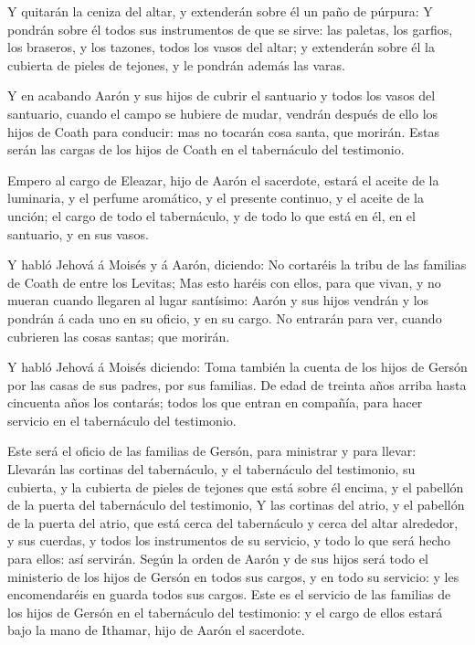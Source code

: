  Y quitarán la ceniza del altar, y extenderán sobre él un
paño de púrpura:  Y pondrán sobre él todos sus instrumentos
de que se sirve: las paletas, los garfios, los braseros, y los tazones,
todos los vasos del altar; y extenderán sobre él la cubierta de pieles
de tejones, y le pondrán además las varas.

 Y en acabando Aarón y sus hijos de cubrir el santuario y
todos los vasos del santuario, cuando el campo se hubiere de mudar,
vendrán después de ello los hijos de Coath para conducir: mas no tocarán
cosa santa, que morirán. Estas serán las cargas de los hijos de Coath en
el tabernáculo del testimonio.

 Empero al cargo de Eleazar, hijo de Aarón el sacerdote,
estará el aceite de la luminaria, y el perfume aromático, y el presente
continuo, y el aceite de la unción; el cargo de todo el tabernáculo, y
de todo lo que está en él, en el santuario, y en sus vasos.

 Y habló Jehová á Moisés y á Aarón, diciendo: 
No cortaréis la tribu de las familias de Coath de entre los Levitas;
 Mas esto haréis con ellos, para que vivan, y no mueran
cuando llegaren al lugar santísimo: Aarón y sus hijos vendrán y los
pondrán á cada uno en su oficio, y en su cargo.  No
entrarán para ver, cuando cubrieren las cosas santas; que morirán.

 Y habló Jehová á Moisés diciendo:  Toma
también la cuenta de los hijos de Gersón por las casas de sus padres,
por sus familias.  De edad de treinta años arriba hasta
cincuenta años los contarás; todos los que entran en compañía, para
hacer servicio en el tabernáculo del testimonio.

 Este será el oficio de las familias de Gersón, para
ministrar y para llevar:  Llevarán las cortinas del
tabernáculo, y el tabernáculo del testimonio, su cubierta, y la cubierta
de pieles de tejones que está sobre él encima, y el pabellón de la
puerta del tabernáculo del testimonio,  Y las cortinas del
atrio, y el pabellón de la puerta del atrio, que está cerca del
tabernáculo y cerca del altar alrededor, y sus cuerdas, y todos los
instrumentos de su servicio, y todo lo que será hecho para ellos: así
servirán.  Según la orden de Aarón y de sus hijos será todo
el ministerio de los hijos de Gersón en todos sus cargos, y en todo su
servicio: y les encomendaréis en guarda todos sus cargos. 
Este es el servicio de las familias de los hijos de Gersón en el
tabernáculo del testimonio: y el cargo de ellos estará bajo la mano de
Ithamar, hijo de Aarón el sacerdote.

